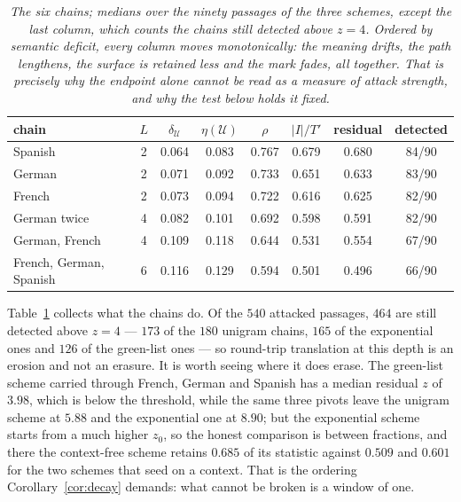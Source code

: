 \documentclass[11pt,a4paper]{article}
\theoremstyle{plain}
\theoremstyle{definition}
\numberwithin{equation}{section}
\newcommand{\Uc}{\mathcal{U}}
\begin{document}
\begin{table}[t]
\centering
\small
\begin{tabular}{lccccccc}
\toprule
chain & $L$ & $\delta_\Uc$ & $\eta(\Uc)$ & $\rho$ & $|I|/T'$ &
residual & detected\\
\midrule
Spanish                 & 2 & 0.064 & 0.083 & 0.767 & 0.679 & 0.680 & 84/90\\
German                  & 2 & 0.071 & 0.092 & 0.733 & 0.651 & 0.633 & 83/90\\
French                  & 2 & 0.073 & 0.094 & 0.722 & 0.616 & 0.625 & 82/90\\
German twice            & 4 & 0.082 & 0.101 & 0.692 & 0.598 & 0.591 & 82/90\\
German, French          & 4 & 0.109 & 0.118 & 0.644 & 0.531 & 0.554 & 67/90\\
French, German, Spanish & 6 & 0.116 & 0.129 & 0.594 & 0.501 & 0.496 & 66/90\\
\bottomrule
\end{tabular}
\caption{\emph{The six chains; medians over the ninety passages of the
three schemes, except the last column, which counts the chains still
detected above $z = 4$. Ordered by semantic deficit, every column moves
monotonically: the meaning drifts, the path lengthens, the surface is
retained less and the mark fades, all together. That is precisely why
the endpoint alone cannot be read as a measure of attack strength, and
why the test below holds it fixed.}}
\label{tab:chains}
\end{table}

Table~\ref{tab:chains} collects what the chains do. Of the $540$
attacked passages, $464$ are still detected above $z = 4$ --- $173$ of
the $180$ unigram chains, $165$ of the exponential ones and $126$ of the
green-list ones --- so round-trip translation at this depth is an
erosion and not an erasure. It is worth seeing where it does erase. The
green-list scheme carried through French, German and Spanish has a
median residual $z$ of $3.98$, which is below the threshold, while the
same three pivots leave the unigram scheme at $5.88$ and the exponential
one at $8.90$; but the exponential scheme starts from a much higher
$z_0$, so the honest comparison is between fractions, and there the
context-free scheme retains $0.685$ of its statistic against $0.509$ and
$0.601$ for the two schemes that seed on a context. That is the ordering
Corollary~\ref{cor:decay} demands: what cannot be broken is a window of
one.
\end{document}
